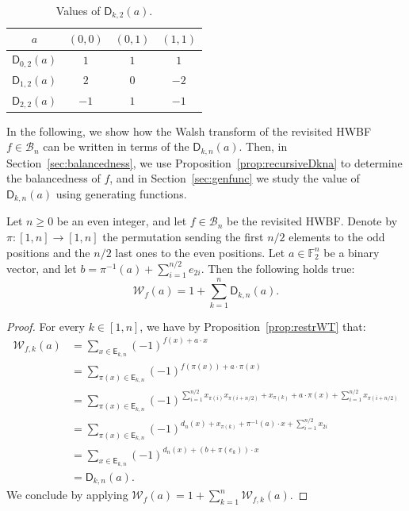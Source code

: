 \documentclass[runningheads,orivec]{llncs}
\newcommand{\BN}{\mathcal{B}_n}
\newcommand{\Dkna}[3]{\mathsf{D}_{#2,#1}(a)}
\newcommand{\Ekn}[2]{\mathsf{E}_{#1,#2}}
\newcommand{\F}{\mathbb{F}}
\newcommand{\hwbf}{\textsf{HWBF}}
\newcommand{\wt}[1]{\mathcal W_{#1}}
\newcommand{\wtk}[2]{\mathcal{W}_{#1,#2}}
\let\geq=\geqslant
\begin{document}
    \begin{table}
    	\scriptsize
    	\centering
        \caption{Values of $\Dkna{2}{k}{a}$.}
        \label{tab:Dkna}
    	\begin{tabular}{|c|c|c|c|}
    		\hline
    		$a$ & $(0,0)$ & $(0,1)$ & $(1,1)$ \\
    		\hline
    		$\Dkna{2}{0}{a}$ &$1$&$1$ & $1$\\
    		$\Dkna{2}{1}{a}$ &$2$& $0$ & $-2$\\
    		$\Dkna{2}{2}{a}$ &$-1$&$1$ & $-1$\\
    		\hline
    	\end{tabular}
    \end{table}
    
    In the following, we show how the Walsh transform of the revisited \hwbf{} $f\in\BN$ can be written in terms of the $\Dkna{n}{k}{a}$. Then, in Section~\ref{sec:balancedness}, we use Proposition~\ref{prop:recursiveDkna} to determine the balancedness of $f$, and in Section~\ref{sec:genfunc} we study the value of $\Dkna{n}{k}{a}$ using generating functions.
    
    \begin{proposition}\label{prop:WT}
    	Let $n\geq 0$ be an even integer, and let $f\in\BN$ be the revisited \hwbf{}. Denote by $\pi:[1,n]\to[1,n]$ the permutation sending the first $n/2$ elements to the odd positions and the $n/2$ last ones to the even positions. Let $a\in\F_2^n$ be a binary vector, and let $b=\pi^{-1}(a)+\sum_{i=1}^{n/2}e_{2i}$. Then the following holds true:
    	\[ \wt{f}(a)=1+\sum_{k=1}^n \Dkna{n}{k}{b+\pi(e_k)}.\]
    \end{proposition}
    
    \begin{proof}
    	For every $k\in[1,n]$, we have by Proposition~\ref{prop:restrWT} that:
    	\begin{align*}
    		\wtk{f}{k}(a)&=\sum_{x \in \Ekn{k}{n}} (-1)^{f(x)+a\cdot x}\\
    		&=\sum_{\pi(x) \in \Ekn{k}{n}} (-1)^{f(\pi(x))+a\cdot \pi(x)}\\
    		&=\sum_{\pi(x) \in \Ekn{k}{n}} (-1)^{\sum_{i=1}^{n/2} x_{\pi(i)} x_{\pi(i+n/2)}+ x_{\pi(k)}+a\cdot \pi(x)+ \sum_{i=1}^{n/2} x_{\pi(i+n/2)}}\\
    		&=\sum_{\pi(x) \in \Ekn{k}{n}}(-1)^{d_n(x)+x_{\pi(k)}+\pi^{-1}(a)\cdot x+\sum_{i=1}^{n/2}x_{2i}}\\
    		&=\sum_{x\in \Ekn{k}{n}}(-1)^{d_n(x)+(b+\pi(e_k))\cdot x}\\
    		&=\Dkna{n}{k}{b+\pi(e_k)}.
    	\end{align*}
    	We conclude by applying $\wt{f}(a)=1+\sum_{k=1}^n\wtk{f}{k}(a)$.
    \end{proof}
    
\end{document}
